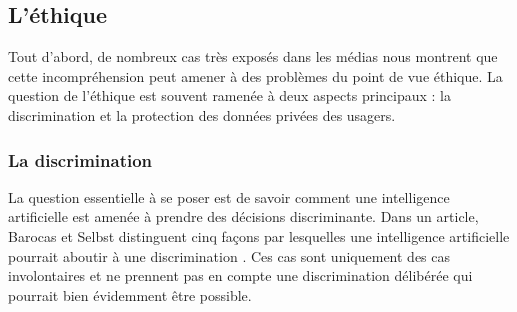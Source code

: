 \subsection{L'éthique}
Tout d'abord, de nombreux cas très exposés dans les médias nous montrent que cette incompréhension peut amener à des problèmes du point de vue éthique. La question de l'éthique est souvent ramenée à deux aspects principaux : la discrimination et la protection des données privées des usagers.
\subsubsection{La discrimination}
La question essentielle à se poser est de savoir comment une intelligence artificielle est amenée à prendre des décisions discriminante. Dans un article, Barocas et Selbst distinguent cinq façons par lesquelles une intelligence artificielle pourrait aboutir à une discrimination \cite{discriminationWay}. Ces cas sont uniquement des cas involontaires et ne prennent pas en compte une discrimination délibérée qui pourrait bien évidemment être possible.
